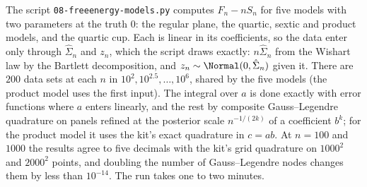 \begin{refsection}
The script \texttt{08-freeenergy-models.py} computes $F_n-nS_n$ for five models with two parameters at the truth $0$: the regular plane, the quartic, sextic and product models, and the quartic cup. Each is linear in its coefficients, so the data enter only through $\hat\Sigma_n$ and $z_n$, which the script draws exactly: $n\hat\Sigma_n$ from the Wishart law by the Bartlett decomposition, and $z_n\sim\Normal(0,\hat\Sigma_n)$ given it. There are $200$ data sets at each $n$ in $10^2,10^{2.5},\dots,10^6$, shared by the five models (the product model uses the first input). The integral over $a$ is done exactly with error functions where $a$ enters linearly, and the rest by composite Gauss--Legendre quadrature on panels refined at the posterior scale $n^{-1/(2k)}$ of a coefficient $b^k$; for the product model it uses the kit's exact quadrature in $c=ab$. At $n=100$ and $1000$ the results agree to five decimals with the kit's grid quadrature on $1000^2$ and $2000^2$ points, and doubling the number of Gauss--Legendre nodes changes them by less than $10^{-14}$. The run takes one to two minutes.


\end{refsection}
